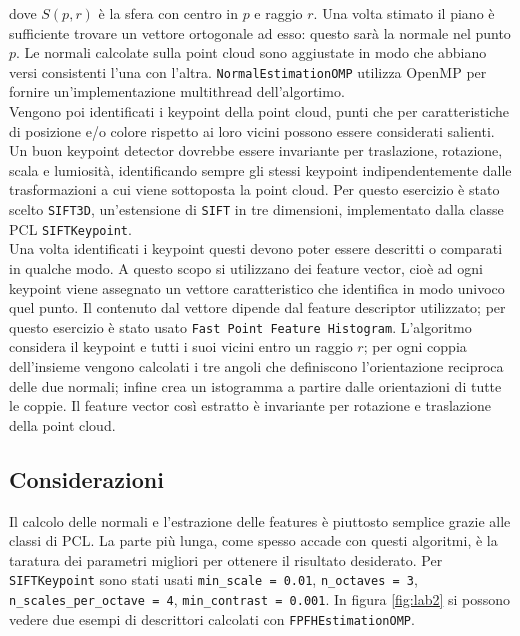 \documentclass[a4paper]{article}
\begin{document}
	dove $S(p,r)$ è la sfera con centro in $p$ e raggio $r$. Una volta stimato il piano è sufficiente trovare un vettore ortogonale ad esso: questo sarà la normale nel punto $p$. Le normali calcolate sulla point cloud sono aggiustate in modo che abbiano versi consistenti l'una con l'altra. \verb|NormalEstimationOMP| utilizza OpenMP per fornire un'implementazione multithread dell'algortimo. \\
	Vengono poi identificati i keypoint della point cloud, punti che per caratteristiche di posizione e/o colore rispetto ai loro vicini possono essere considerati salienti. Un buon keypoint detector dovrebbe essere invariante per traslazione, rotazione, scala e lumiosità, identificando sempre gli stessi keypoint indipendentemente dalle trasformazioni a cui viene sottoposta la point cloud. Per questo esercizio è stato scelto \verb|SIFT3D|, un'estensione di \verb|SIFT| in tre dimensioni, implementato dalla classe PCL \verb|SIFTKeypoint|. \\
	Una volta identificati i keypoint questi devono poter essere descritti o comparati in qualche modo. A questo scopo si utilizzano dei feature vector, cioè ad ogni keypoint viene assegnato un vettore caratteristico che identifica in modo univoco quel punto. Il contenuto dal vettore dipende dal feature descriptor utilizzato; per questo esercizio è stato usato \verb|Fast Point Feature Histogram|. L'algoritmo considera il keypoint e tutti i suoi vicini entro un raggio $r$; per ogni coppia dell'insieme vengono calcolati i tre angoli che definiscono l'orientazione reciproca delle due normali; infine crea un istogramma a partire dalle orientazioni di tutte le coppie. Il feature vector così estratto è invariante per rotazione e traslazione della point cloud.

	\subsection{Considerazioni} \label{sec:lab2_disc}
	Il calcolo delle normali e l'estrazione delle features è piuttosto semplice grazie alle classi di PCL. La parte più lunga, come spesso accade con questi algoritmi, è la taratura dei parametri migliori per ottenere il risultato desiderato. Per \verb|SIFTKeypoint| sono stati usati \verb|min_scale = 0.01|, \verb|n_octaves = 3|, \verb|n_scales_per_octave = 4|, \verb|min_contrast = 0.001|. In figura \ref{fig:lab2} si possono vedere due esempi di descrittori calcolati con \verb|FPFHEstimationOMP|.
	
\end{document}
